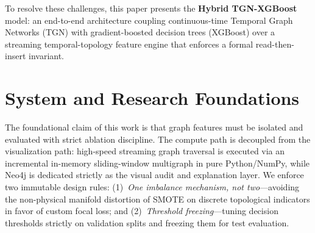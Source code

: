 To resolve these challenges, this paper presents the \textbf{Hybrid TGN-XGBoost} model: an end-to-end architecture coupling continuous-time Temporal Graph Networks (TGN) with gradient-boosted decision trees (XGBoost) over a streaming temporal-topology feature engine that enforces a formal read-then-insert invariant.

\section{System and Research Foundations}\label{sec:foundations}
The foundational claim of this work is that graph features must be isolated and evaluated with strict ablation discipline. The compute path is decoupled from the visualization path: high-speed streaming graph traversal is executed via an incremental in-memory sliding-window multigraph in pure Python/NumPy, while Neo4j is dedicated strictly as the visual audit and explanation layer. We enforce two immutable design rules: (1)~\emph{One imbalance mechanism, not two}---avoiding the non-physical manifold distortion of SMOTE on discrete topological indicators in favor of custom focal loss; and (2)~\emph{Threshold freezing}---tuning decision thresholds strictly on validation splits and freezing them for test evaluation.
